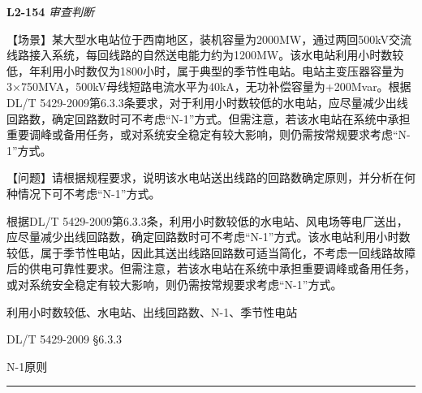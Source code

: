 \documentclass[12pt,a4paper]{ctexart}
\begin{document}
\noindent\textbf{L2-154} \hfill \textit{审查判断}
\begin{description}[leftmargin=1.5em,style=nextline,font=\normalfont]
  \item[Q:] 【场景】某大型水电站位于西南地区，装机容量为2000MW，通过两回500kV交流线路接入系统，每回线路的自然送电能力约为1200MW。该水电站利用小时数较低，年利用小时数仅为1800小时，属于典型的季节性电站。电站主变压器容量为3×750MVA，500kV母线短路电流水平为40kA，无功补偿容量为+200Mvar。根据DL/T 5429-2009第6.3.3条要求，对于利用小时数较低的水电站，应尽量减少出线回路数，确定回路数时可不考虑“N-1”方式。但需注意，若该水电站在系统中承担重要调峰或备用任务，或对系统安全稳定有较大影响，则仍需按常规要求考虑“N-1”方式。

【问题】请根据规程要求，说明该水电站送出线路的回路数确定原则，并分析在何种情况下可不考虑“N-1”方式。
  \item[A:] 根据DL/T 5429-2009第6.3.3条，利用小时数较低的水电站、风电场等电厂送出，应尽量减少出线回路数，确定回路数时可不考虑“N-1”方式。该水电站利用小时数较低，属于季节性电站，因此其送出线路回路数可适当简化，不考虑一回线路故障后的供电可靠性要求。但需注意，若该水电站在系统中承担重要调峰或备用任务，或对系统安全稳定有较大影响，则仍需按常规要求考虑“N-1”方式。
  \item[KW:] 利用小时数较低、水电站、出线回路数、N-1、季节性电站
  \item[Std:] DL/T 5429-2009 §6.3.3
  \item[Topic:] N-1原则
\end{description}
\vspace{4pt}
\hrule\vspace{6pt}
\end{document}
